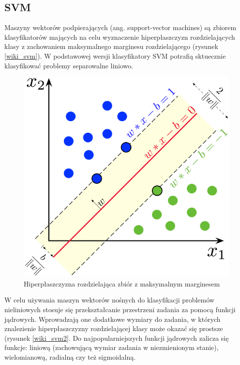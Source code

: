 \documentclass[a4paper, twoside, 11pt, openright]{article}
\begin{document}
\subsection{SVM \cite{svm}}

Maszyny wektorów podpierających (ang. support-vector machines) są zbiorem klasyfikatorów mających na celu wyznaczenie hiperpłaszczyzn rozdzielających klasy z zachowaniem maksymalnego marginesu rozdzielającego (rysunek \ref{wiki_svm}). W podstawowej wersji klasyfikatory SVM potrafią sktuecznie klasyfikować problemy separowalne liniowo.


\begin{figure}[H]
\centering \includegraphics[scale=0.9]{img/svm.png}
\caption{Hiperpłaszczyzna rozdzielająca zbiór z maksymalnym marginesem \cite{wikisvm}}
\label{mlpnn}
\end{figure}

W celu używania maszyn wektorów nośnych do klasyfikacji problemów nieliniowych stosuje się przekształcanie przestrzeni zadania za pomocą funkcji jądrowych. Wprowadzają one dodatkowe wymiary do zadania, w których znalezienie hiperpłaszczyzny rozdzielającej klasy może okazać się prostsze (rysunek \ref{wiki_svm2}. Do najpopularniejszych funkcji jądrowych zalicza się funkcje: liniową (zachowującą wymiar zadania w niezmienionym stanie), wielomianową, radialną czy też sigmoidalną.
\end{document}
